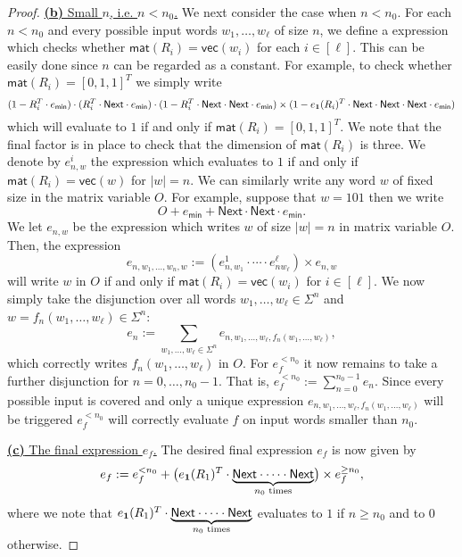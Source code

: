 \begin{proof}
\medskip
\noindent
\underline{\textbf{(b)} Small $n$, i.e. $n< n_0$.}	
We next consider the case when $n<n_0$. For each $n<n_0$ and every possible input words
    $w_1,\ldots,w_\ell$ of size $n$, we define a \langfor expression which checks whether
    $\mathsf{mat}(R_i)=\mathsf{vec}(w_i)$ for each $i\in[\ell]$. This can be easily done since $n$ 
    can be regarded as a constant. For example, to check whether $\mathsf{mat}(R_i)=[0,1,1]^T$ we simply write
    $$
    (1- R_i^T\cdot e_{\mathsf{min}})\cdot (R_i^T\cdot \mathsf{Next}\cdot e_{\mathsf{min}})\cdot (1- R_i^T\cdot \mathsf{Next}\cdot \mathsf{Next}\cdot e_{\mathsf{min}})\times (1- e_{\mathbf{1}}(R_i)^T\cdot \mathsf{Next}\cdot \mathsf{Next}\cdot \mathsf{Next}\cdot e_{\mathsf{min}})
    $$
    which will evaluate to $1$ if and only if $\mathsf{mat}(R_i)=[0,1,1]^T$. We note that the final factor is in 
    place to check that the dimension of $\mathsf{mat}(R_i)$ is three.
    We denote by
    $e_{n,w}^i$ the expression which evaluates to $1$ if and only if $\mathsf{mat}(R_i)=\mathsf{vec}(w)$
    for $|w|=n$.
    We can similarly
    write any word $w$ of fixed size in the matrix variable $O$. For example, suppose that $w=101$
    then we write 
    $$
    O+ e_{\mathsf{min}}+  \mathsf{Next}\cdot \mathsf{Next}\cdot e_{\mathsf{min}}.
    $$
    We let $e_{n,w}$ be the expression which writes $w$ of size $|w|=n$ in matrix variable $O$.
    Then, the expression
    $$
    e_{n,w_1,\ldots,w_n,w}:=(e_{n,w_1}^1\cdot\cdots\cdot e_{nw_{\ell}}^\ell)\times e_{n,w}
    $$
    will write $w$ in $O$ if and only if $\mathsf{mat}(R_i)=\mathsf{vec}(w_i)$ for $i\in[\ell]$.
    We now simply take the disjunction over all words 
    $w_1,\ldots,w_\ell\in\Sigma^n$ and $w=f_n(w_1,\ldots,w_\ell)\in\Sigma^n$:
    $$
    e_n:=\sum_{w_1,\ldots,w_\ell\in\Sigma^n} e_{n,w_1,\ldots,w_\ell,f_n(w_1,\ldots,w_\ell)},
    $$
    which correctly writes $f_n(w_1,\ldots,w_\ell)$ in $O$. For $e_f^{<n_0}$ it now remains
to take a further disjunction for $n=0,\ldots, n_0-1$. That is,
    $
    e_f^{<n_0}:=\sum_{n=0}^{n_0-1} e_n
    $.
    Since every possible input is covered and only a unique expression 
    $e_{n,w_1,\ldots,w_\ell,f_n(w_1,\ldots,w_\ell)}$ will be triggered $e_f^{<n_0}$ will correctly
    evaluate $f$ on input words smaller than $n_0$.

\medskip
\noindent
\underline{\textbf{(c)} The final expression $e_f$.}	
 The desired final expression $e_f$ is now given by
    $$
    e_f:=e_f^{<n_0} + \bigl(e_{\mathbf{1}}(R_1)^T\cdot\underbrace{\mathsf{Next}\cdot\cdots\cdot \mathsf{Next}}_{\text{$n_0$ times}}\bigr)\times e_f^{\geq n_0},
    $$
where we note that $e_{\mathbf{1}}(R_1)^T\cdot\underbrace{\mathsf{Next}\cdot\cdots\cdot \mathsf{Next}}_{\text{$n_0$ times}}$ evaluates to $1$ if
$n\geq n_0$ and to $0$ otherwise.
\end{proof}

